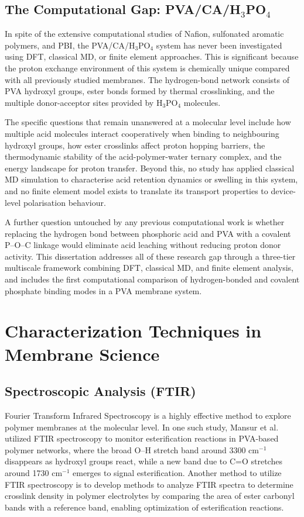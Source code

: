 \documentclass[12pt,a4paper]{report}
\begin{document}
\subsection{The Computational Gap: PVA/CA/H\(_3\)PO\(_4\)}

In spite of the extensive computational studies of Nafion, 
sulfonated aromatic polymers, and PBI, the 
PVA/CA/H\(_3\)PO\(_4\) system has never been investigated 
using DFT, classical MD, or finite element approaches. This 
is significant because the proton exchange environment of 
this system is chemically unique compared with all previously 
studied membranes. The hydrogen-bond network consists of 
PVA hydroxyl groups, ester bonds formed by thermal 
crosslinking, and the multiple donor-acceptor sites provided 
by H\(_3\)PO\(_4\) molecules.\cite{20,59}

The specific questions that remain unanswered at a molecular 
level include how multiple acid molecules interact 
cooperatively when binding to neighbouring hydroxyl groups, 
how ester crosslinks affect proton hopping barriers, the 
thermodynamic stability of the acid-polymer-water ternary 
complex, and the energy landscape for proton transfer. 
Beyond this, no study has applied classical MD simulation 
to characterise acid retention dynamics or swelling in this 
system, and no finite element model exists to translate its 
transport properties to device-level polarisation 
behaviour.\cite{53,54}

A further question untouched by any previous computational 
work is whether replacing the hydrogen bond between 
phosphoric acid and PVA with a covalent P--O--C linkage 
would eliminate acid leaching without reducing proton donor 
activity. This dissertation addresses all of these research gap 
through a three-tier multiscale framework combining DFT, 
classical MD, and finite element analysis, and includes 
the first computational comparison of hydrogen-bonded and 
covalent phosphate binding modes in a PVA membrane 
system.\cite{18,19}



\section{Characterization Techniques in Membrane Science}
\subsection{Spectroscopic Analysis (FTIR)}
Fourier Transform Infrared Spectroscopy is a highly effective method to explore polymer membranes at the molecular level. In one such study, Mansur et al. utilized FTIR spectroscopy to monitor esterification reactions in PVA-based polymer networks, where the broad O–H stretch band around 3300 cm\(^{-1}\) disappears as hydroxyl groups react, while a new band due to C=O stretches around 1730 cm\(^{-1}\) emerges to signal esterification. Another method to utilize FTIR spectroscopy is to develop methods to analyze FTIR spectra to determine crosslink density in polymer electrolytes by comparing the area of ester carbonyl bands with a reference band, enabling optimization of esterification reactions.\cite{52}
\end{document}
